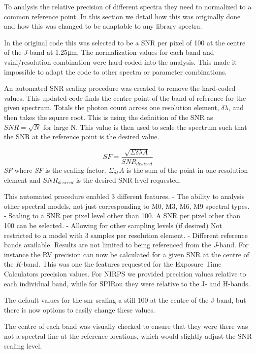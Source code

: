 To analysis the relative precision of different spectra they need to normalized to a common reference point. In this section we detail how this was originally done and how this was changed to be adaptable to any library spectra.

In the original code this was selected to be a SNR per pixel of 100 at the centre of the \textit{J}-band at 1.25\si{\micro\meter}. The normalization values for each band and vsini/resolution combination were hard-coded into the analysis. This made it impossible to adapt the code to other spectra or parameter combinations.

An automated SNR scaling procedure was created to remove the hard-coded values. This updated code finds the centre point of the band of reference for the given spectrum. Totals the photon count across one resolution element, \(\delta\lambda\), and then takes the square root. This is using the definition of the SNR as \(SNR = \sqrt{N}\) for large N. This value is then used to scale the spectrum such that the SNR at the reference point is the desired value.

\begin{equation}
    SF =  \frac{\sqrt{\Sigma{\delta\lambda} A}} {SNR_{desired}}
\end{equation}
\textit{SF} where \textit{SF} is the scaling factor, \(\Sigma_{\delta\lambda} A\) is the sum of the point in one resolution element and \(SNR_{desired}\) is the desired SNR level requested.

This automated procedure enabled 3 different features.
- The ability to analysis other spectral models, not just corresponding to M0, M3, M6, M9 spectral types.
- Scaling to a SNR per pixel level other than 100.
    A SNR per pixel other than 100 can be selected.
- Allowing for other sampling levels (if desired)
      Not restricted to a model with 3 samples per resolution element.
- Different reference bands available.
    Results are not limited to being referenced from the \textit{J}-band. For instance the RV precision can now be calculated for a given SNR at the centre of the \textit{K}-band. This was one the features requested for the Exposure Time Calculators precision values. For NIRPS we provided precision values relative to each individual band, while for SPIRou they were relative to the {J}- and {H}-bands.

The default values for the snr scaling a still 100 at the centre of the J band, but there is now options to easily change these values.

The centre of each band was visually checked to ensure that they were there was not a spectral line at the reference locations, which would slightly adjust the SNR scaling level.


